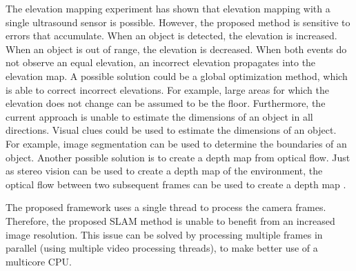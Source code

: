The elevation mapping experiment has shown that elevation mapping with a single ultrasound sensor is possible.
However, the proposed method is sensitive to errors that accumulate.
When an object is detected, the elevation is increased.
When an object is out of range, the elevation is decreased.
When both events do not observe an equal elevation, an incorrect elevation propagates into the elevation map.
A possible solution could be a global optimization method, which is able to correct incorrect elevations.
For example, large areas for which the elevation does not change can be assumed to be the floor.
Furthermore, the current approach is unable to estimate the dimensions of an object in all directions.
Visual clues could be used to estimate the dimensions of an object.
For example, image segmentation can be used to determine the boundaries of an object.
Another possible solution is to create a depth map from optical flow.
Just as stereo vision can be used to create a depth map of the environment, the optical flow between two subsequent frames can be used to create a depth map \cite{Jurriaans2011}.

The proposed framework uses a single thread to process the camera frames.
Therefore, the proposed SLAM method is unable to benefit from an increased image resolution.
This issue can be solved by processing multiple frames in parallel (using multiple video processing threads), to make better use of a multicore CPU.